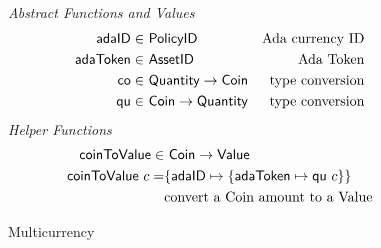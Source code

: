 \begin{figure*}[htb]
  \emph{Abstract Functions and Values}
  \begin{align*}
    \mathsf{adaID} \in& ~\mathsf{PolicyID}
    & \text{Ada currency ID} \\
    \mathsf{adaToken} \in& ~\mathsf{AssetID}
    & \text{Ada Token} \\
    \mathsf{co} \in& ~\mathsf{Quantity} \to \mathsf{Coin}
    & \text{type conversion} \\
    \mathsf{qu} \in& ~\mathsf{Coin} \to \mathsf{Quantity}
    & \text{type conversion} \\
  \end{align*}
  \emph{Helper Functions}
  \begin{align*}
    \mathsf{coinToValue} \in & ~\mathsf{Coin}\to \mathsf{Value} \\
    \mathsf{coinToValue}~ c = & \{\mathsf{adaID} \mapsto \{\mathsf{adaToken} \mapsto \mathsf{qu}~c\}\} \\
    &\text{convert a Coin amount to a Value} \\
  \end{align*}
  \caption{Multicurrency}
  \label{fig:defs:functions-helper}
\end{figure*}

\clearpage
